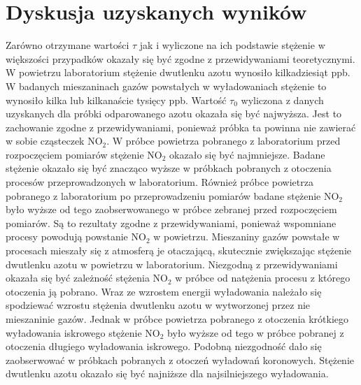 \documentclass[10pt,a4paper]{article}
\begin{document}
\section{Dyskusja uzyskanych wyników}
Zarówno otrzymane wartości $\tau$ jak i wyliczone na ich podstawie stężenie w większości przypadków okazały się być zgodne z przewidywaniami teoretycznymi. W powietrzu laboratorium stężenie dwutlenku azotu wynosiło kilkadziesiąt ppb. W badanych mieszaninach gazów powstałych w wyładowaniach stężenie to wynosiło kilka lub kilkanaście tysięcy ppb.  Wartość $\tau_0$ wyliczona z danych uzyskanych dla próbki odparowanego azotu okazała się być najwyższa. Jest to zachowanie zgodne z przewidywaniami, ponieważ próbka ta powinna nie zawierać w sobie cząsteczek $\text{NO}_{\text{2}}$. W próbce powietrza pobranego z laboratorium przed rozpoczęciem pomiarów stężenie $\text{NO}_{\text{2}}$ okazało się być najmniejsze. Badane stężenie okazało się być znacząco wyższe w próbkach pobranych z otoczenia procesów przeprowadzonych w laboratorium. Również  próbce powietrza pobranego z laboratorium po przeprowadzeniu pomiarów badane stężenie $\text{NO}_{\text{2}}$ było wyższe od tego zaobserwowanego w próbce zebranej przed rozpoczęciem pomiarów. Są to rezultaty zgodne z przewidywaniami, ponieważ wspomniane procesy powodują powstanie $\text{NO}_{\text{2}}$ w powietrzu. Mieszaniny gazów powstałe w procesach mieszały się z atmosferą je otaczającą, skutecznie zwiększając stężenie dwutlenku azotu w powietrzu w laboratorium.
Niezgodną z przewidywaniami okazała się być zależność stężenia $\text{NO}_{\text{2}}$ w próbce od natężenia procesu z którego otoczenia ją pobrano. Wraz ze wzrostem energii wyładowania należało się spodziewać wzrostu stężenia dwutlenku azotu w wytworzonej przez nie mieszaninie gazów. Jednak w próbce powietrza pobranego z otoczenia krótkiego wyładowania iskrowego stężenie $\text{NO}_{\text{2}}$ było wyższe od tego w próbce pobranej z otoczenia długiego wyładowania iskrowego. Podobną niezgodność dało się zaobserwować w próbkach pobranych z otoczeń wyładowań koronowych. Stężenie dwutlenku azotu okazało się być najniższe dla najsilniejszego wyładowania.
\end{document}
